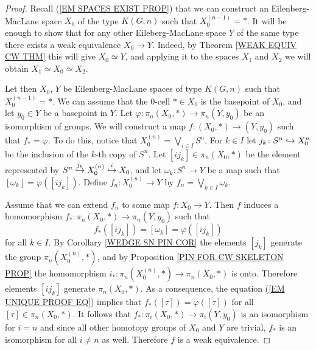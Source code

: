 \begin{proof}
Recall (\ref{EM SPACES EXIST PROP}) that we can construct an Eilenberg-MacLane space 
$X_{0}$ of the type $K(G, n)$ such that $X_{0}^{(n-1)} = \ast$. It will be enough to show 
that for any other Eileberg-MacLane space $Y$ of the same type there exists a weak equivalence 
$X_{0}\to Y$. Indeed, by Theorem \ref{WEAK EQUIV CW THM} this will give $X_{0}\simeq Y$,  
and applying it to the spaces $X_{1}$ and $X_{2}$ we will obtain $X_{1}\simeq X_{0}\simeq X_{2}$.

Let then $X_{0}$, $Y$ be Eilenberg-MacLane spaces of type $K(G, n)$ such that $X_{0}^{(n-1)} = \ast$. 
We can assume that the 0-cell $\ast\in X_{0}$ is the basepoint of $X_{0}$, and let $y_{0} \in Y$ be 
a basepoint in $Y$. Let $\varphi\colon \pi_{n}(X_{0}, \ast) \to \pi_{n}(Y, y_{0})$ be 
an isomorphism of groups. We will construct a map $f\colon (X_{0}, \ast) \to (Y, y_{0})$
such that $f_{\ast} = \varphi$. To do this, notice that $X_{0}^{(n)} = \bigvee_{i\in I} S^{n}$. 
For $k\in I$ let $j_{k}\colon S^{n}\hookrightarrow X_{0}^{n}$ be the inclusion of the $k$-th copy of $S^{n}$. 
Let $[ij_{k}]\in \pi_{n}(X_{0}, \ast)$ be the element represented by 
$S^{n}\overset{j_{k}}{\hookrightarrow} X_{0}^{(n)}\overset{i}{\hookrightarrow} X_{0}$, and let 
$\omega_{k}\colon S^{n}\to Y$ be a map such that $[\omega_{k}] = \varphi([ij_{k}])$. 
Define $f_{n}\colon X_{0}^{(n)} \to Y$ by $f_{n} = \bigvee_{k\in I} \omega_{k}$. 

Assume that we can extend $f_{n}$ to some map $f\colon X_{0} \to Y$. Then
$f$ induces a homomorphism $f_{\ast}\colon \pi_{n}(X_{0}, \ast) \to \pi_{n}(Y, y_{0})$
such that 
\begin{equation*}
\label{EM UNIQUE PROOF EQ}
\tag{$\ast$}
f_{\ast}([ij_{k}]) = [\omega_{k}] = \varphi([ij_{k}])
\end{equation*}
for all $k\in I$. 
By Corollary \ref{WEDGE SN PIN COR} the elements $[j_{k}]$ generate the group 
$\pi_{n}(X_{0}^{(n)}, \ast)$, and by Proposition \ref{PIN FOR CW SKELETON PROP}
the homomorphism $i_{\ast} \colon \pi_{n}(X_{0}^{(n)}, \ast) \to \pi_{n}(X_{0}, \ast)$ is onto. 
Therefore elements $[ij_{k}]$ generate $\pi_{n}(X_{0}, \ast)$. As a consequence, the equation 
(\ref{EM UNIQUE PROOF EQ}) implies that $f_{\ast}([\tau]) = \varphi([\tau])$ for all 
$[\tau]\in \pi_{n}(X_{0}, \ast)$. It follows that 
$f_{\ast}\colon \pi_{i}(X_{0}, \ast) \to \pi_{i}(Y, y_{0})$ is an isomorphism for 
$i=n$ and since all other homotopy groups of $X_{0}$ and $Y$ are trivial, $f_{\ast}$ is
an isomorphism for all $i\neq n$ as well. Therefore $f$ is a weak equivalence. 


\end{proof}
